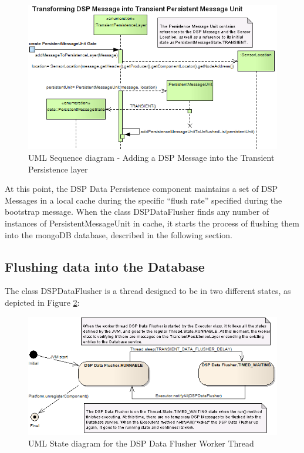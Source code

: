 \begin{figure}[!b]
  \centering
  \includegraphics[scale=0.65]{../diagrams/From-Create-PersistentMessageUnit-to-TransientPersistence-Layer-Sequence}
  \caption{UML Sequence diagram - Adding a DSP Message into the Transient Persistence layer}
  \label{fig:From-Create-PersistentMessageUnit-to-TransientPersistence-Layer-Sequence}
\end{figure}

At this point, the DSP Data Persistence component maintains a set of DSP
Messages in a local cache during the specific ``flush rate'' specified during
the bootstrap message. When the class DSPDataFlusher finds any number of
instances of PersistentMessageUnit in cache, it starts the process of flushing
them into the mongoDB database, described in the following section.

\subsection{Flushing data into the Database}

The class DSPDataFlusher is a thread designed to be in two different states, as
depicted in Figure \ref{fig:DSP-DataPersistence-Flusher-State-Diagram}:

\begin{figure}[!h]
  \centering
  \includegraphics[scale=0.65]{../diagrams/DSP-DataPersistence-Flusher-State-Diagram}
  \caption{UML State diagram for the DSP Data Flusher Worker Thread}
  \label{fig:DSP-DataPersistence-Flusher-State-Diagram}
\end{figure}

